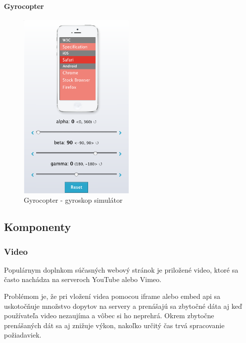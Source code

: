 \paragraph{Gyrocopter} %
\label{par:gyrocopter}

\begin{figure}[H]
  \centering
  \includegraphics[width=0.5\textwidth]{img/gyrocopter.png}
  \caption[Gyrocopter - gyroskop simulátor]{
    Gyrocopter - gyroskop simulátor}
  \label{fig: gyrocopter}
\end{figure}




\subsection{Komponenty} %
\label{sub:komponenty}

\subsubsection{Video} %
\label{subsub:video}

Populárnym doplnkom súčasných webový stránok je priložené video, ktoré sa často nachádza na serveroch YouTube alebo Vimeo.

Problémom je, že pri vložení videa pomocou iframe alebo embed api sa uskotočňuje množstvo dopytov na servery a prenášajú sa zbytočné dáta aj keď používateľa video nezaujíma a vôbec si ho neprehrá. Okrem zbytočne prenášaných dát sa aj znižuje výkon, nakoľko určitý čas trvá spracovanie požiadaviek.

